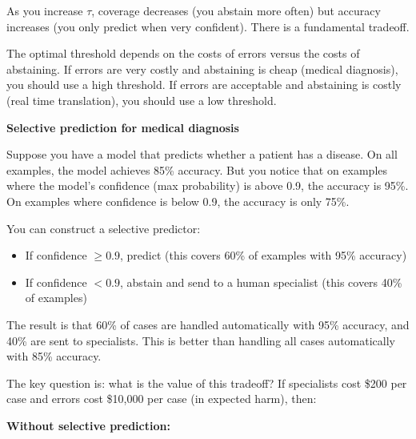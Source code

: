 As you increase $\tau$, coverage decreases (you abstain more often) but accuracy increases (you only predict when very confident). There is a fundamental tradeoff.

The optimal threshold depends on the costs of errors versus the costs of abstaining. If errors are very costly and abstaining is cheap (medical diagnosis), you should use a high threshold. If errors are acceptable and abstaining is costly (real time translation), you should use a low threshold.

\vspace{1.5em}

\begin{examplebox}
\textbf{Selective prediction for medical diagnosis}

\vspace{0.5em}

Suppose you have a model that predicts whether a patient has a disease. On all examples, the model achieves 85\% accuracy. But you notice that on examples where the model's confidence (max probability) is above 0.9, the accuracy is 95\%. On examples where confidence is below 0.9, the accuracy is only 75\%.

\vspace{0.5em}

You can construct a selective predictor:

\begin{itemize}
\item If confidence $\geq 0.9$, predict (this covers 60\% of examples with 95\% accuracy)
\item If confidence $< 0.9$, abstain and send to a human specialist (this covers 40\% of examples)
\end{itemize}

\vspace{0.5em}

The result is that 60\% of cases are handled automatically with 95\% accuracy, and 40\% are sent to specialists. This is better than handling all cases automatically with 85\% accuracy.

\vspace{0.5em}

The key question is: what is the value of this tradeoff? If specialists cost \$200 per case and errors cost \$10,000 per case (in expected harm), then:

\vspace{0.5em}

\textbf{Without selective prediction:}


\end{examplebox}
